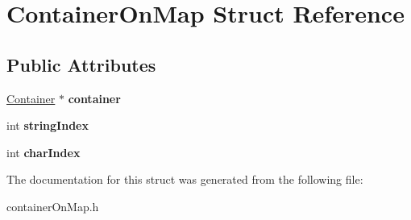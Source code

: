 \hypertarget{struct_container_on_map}{}\section{Container\+On\+Map Struct Reference}
\label{struct_container_on_map}
\subsection*{Public Attributes}
\begin{DoxyCompactItemize}
\item 
\hypertarget{struct_container_on_map_ae1df8d0f0675cf981e411cca41f03913}{}\label{struct_container_on_map_ae1df8d0f0675cf981e411cca41f03913} 
\hyperlink{class_container}{Container} $\ast$ {\bfseries container}
\item 
\hypertarget{struct_container_on_map_af0cec419059f87b45ab740fb9eaefd4a}{}\label{struct_container_on_map_af0cec419059f87b45ab740fb9eaefd4a} 
int {\bfseries string\+Index}
\item 
\hypertarget{struct_container_on_map_a87852d390130c8c650880fea7bedb11f}{}\label{struct_container_on_map_a87852d390130c8c650880fea7bedb11f} 
int {\bfseries char\+Index}
\end{DoxyCompactItemize}


The documentation for this struct was generated from the following file\+:\begin{DoxyCompactItemize}
\item 
container\+On\+Map.\+h\end{DoxyCompactItemize}
